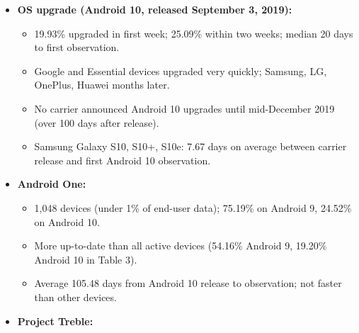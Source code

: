 \documentclass[11pt,a4paper]{article}
\begin{document}
\begin{enumerate}
\begin{itemize}[leftmargin=*, itemsep=1pt, topsep=2pt]
        \begin{itemize}[itemsep=0pt]
            \item Median 11 days (average 15.12 days) from carrier announcement to observed build change.
            \item Devices access app on average every 6.12 days (median six days).
            \item Average 3.44 build numbers per device in 2019.
            \item 70\% of devices updated by day 14; curves flatten around day 14.
            \item Pixel 2 XL on Verizon (30,545 devices): 99.86\% updated after announcement; 30.36\% first seen with new build; 69.50\% seen with old build first.
            \item Paper says user-incurred delay is ``significantly smaller'' than carrier/manufacturer or batch delay.
        \end{itemize}
        \item \textbf{OS upgrade (Android 10, released September 3, 2019):}
        \begin{itemize}[itemsep=0pt]
            \item 19.93\% upgraded in first week; 25.09\% within two weeks; median 20 days to first observation.
            \item Google and Essential devices upgraded very quickly; Samsung, LG, OnePlus, Huawei months later.
            \item No carrier announced Android 10 upgrades until mid-December 2019 (over 100 days after release).
            \item Samsung Galaxy S10, S10+, S10e: 7.67 days on average between carrier release and first Android 10 observation.
        \end{itemize}
        \item \textbf{Android One:}
        \begin{itemize}[itemsep=0pt]
            \item 1,048 devices (under 1\% of end-user data); 75.19\% on Android 9, 24.52\% on Android 10.
            \item More up-to-date than all active devices (54.16\% Android 9, 19.20\% Android 10 in Table 3).
            \item Average 105.48 days from Android 10 release to observation; not faster than other devices.
        \end{itemize}
        \item \textbf{Project Treble:}

\end{itemize}
\end{enumerate}
\end{document}
